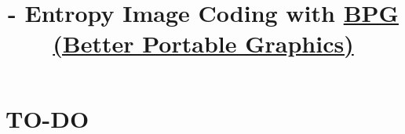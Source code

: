 

\title{\SM{} - Entropy Image Coding with \href{https://en.wikipedia.org/wiki/Better_Portable_Graphics}{BPG (Better Portable Graphics)}}

\maketitle
\tableofcontents

\section{TO-DO}
